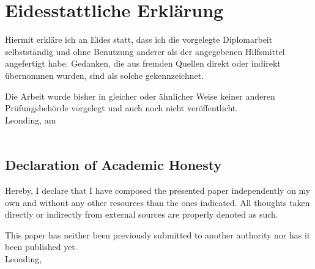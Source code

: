 
\section*{Eidesstattliche Erklärung}
Hiermit erkläre ich an Eides statt, dass ich die vorgelegte Diplomarbeit selbstständig und ohne Benutzung anderer als der angegebenen Hilfsmittel angefertigt habe. Gedanken, die aus fremden Quellen direkt oder indirekt übernommen wurden, sind als solche gekennzeichnet.

Die Arbeit wurde bisher in gleicher oder ähnlicher Weise keiner anderen Prüfungsbehörde vorgelegt und auch noch nicht veröffentlicht. \\[1em]
Leonding, am \duedatede \\[5em]
\ifthenelse{\isundefined{\firstauthor}}{}{\firstauthor}
\ifthenelse{\isundefined{\secondauthor}}{}{\kern-1ex, \secondauthor} \\[5em]


\begin{otherlanguage}{english}
\section*{Declaration of Academic Honesty}
Hereby, I declare that I have composed the presented paper independently on my own and without any other resources than the ones indicated. All thoughts taken directly or indirectly from external sources are properly denoted as such.

This paper has neither been previously submitted to another authority nor has it been published yet. \\[1em]
Leonding, \duedateen \\[5em]
\ifthenelse{\isundefined{\firstauthor}}{}{\firstauthor}
\ifthenelse{\isundefined{\secondauthor}}{}{\kern-1ex, \secondauthor}
\end{otherlanguage}





